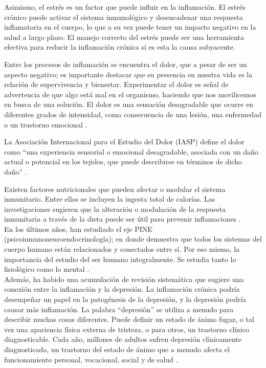 \documentclass[man]{apa7}
\begin{document}
	Asimismo, el estrés es un factor que puede influir en la inflamación. El
	estrés crónico puede activar el sistema inmunológico y desencadenar una
	respuesta inflamatoria en el cuerpo, lo que a su vez puede tener un
	impacto negativo en la salud a largo plazo. El manejo correcto del
	estrés puede ser una herramienta efectiva para reducir la inflamación
	crónica si es esta la causa subyacente.

	Entre los procesos de inflamación se encuentra el dolor, que a pesar de
	ser un aspecto negativo; es importante destacar que su presencia en
	nuestra vida es la relación de supervivencia y bienestar. Experimentar
	el dolor es señal de advertencia de que algo está mal en el organismo,
	haciendo que nos movilicemos en busca de una solución. El dolor es una
	sensación desagradable que ocurre en diferentes grados de intensidad,
	como consecuencia de una lesión, una enfermedad o un trastorno emocional
	\parencite{Farlex2023}.


	La Asociación Internacional para el Estudio del Dolor (IASP) define el dolor como ``una experiencia sensorial o emocional desagradable, asociada con un daño actual o potencial en los tejidos, que puede describirse en términos de dicho daño'' \parencite{PainTermsList1979}.


	Existen factores nutricionales que pueden afectar o modular el sistema
	inmunitario. Entre ellos se incluyen la ingesta total de calorías. Las
	investigaciones sugieren que la alteración o modulación de la respuesta
	inmunitaria a través de la dieta puede ser útil para prevenir
	inflamaciones \parencite{GarciaCasal2014}.\\

	En los últimos años, han estudiado el eje PINE
	(psicoinmunoneuroendocrinología); en donde demuestra que todos los
	sistemas del cuerpo humano están relacionados y conectados entre sí. Por
	eso mismo, la importancia del estudio del ser humano integralmente. Se
	estudia tanto lo fisiológico como lo mental \parencite{Osimo2019}.\\

	Además, ha habido una acumulación de revisión sistemática
	que sugiere una conexión entre la inflamación y la depresión. La
	inflamación crónica podría desempeñar un papel en la patogénesis de la
	depresión, y la depresión podría causar más inflamación. La palabra
	``depresión'' se utiliza a menudo para describir muchas cosas
	diferentes. Puede definir un estado de ánimo fugaz, o tal vez una
	apariencia física externa de tristeza, o para otros, un trastorno
	clínico diagnosticable. Cada año, millones de adultos sufren depresión
	clínicamente diagnosticada, un trastorno del estado de ánimo que a
	menudo afecta el funcionamiento personal, vocacional, social y de salud
	\parencite{APA2014}.
\end{document}
